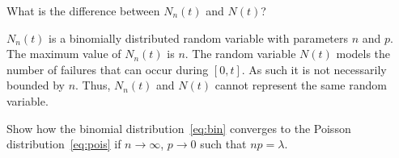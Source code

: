 \begin{question}
What is the difference between $N_n(t)$ and $N(t)$?
\begin{solution}
  $N_n(t)$ is a binomially distributed random variable with parameters
  $n$ and $p$. The maximum value of $N_n(t)$ is $n$. The random
  variable $N(t)$ models the number of failures that can occur during
  $[0,t]$. As such it is not necessarily bounded by $n$. Thus, $N_n(t)$ and $N(t)$ cannot represent the same random variable. 
\end{solution}
\end{question}

\begin{question}
  Show how the binomial distribution~\eqref{eq:bin} converges to the
  Poisson distribution~\eqref{eq:pois} if $n\to\infty$, $p\to0$ such
  that $np=\lambda$. 

  \begin{hint}
  \end{hint}


\end{question}
